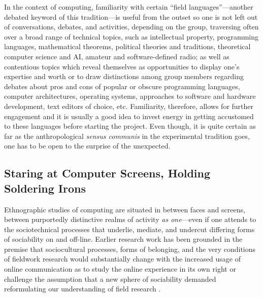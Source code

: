 \documentclass[10pt,letter,oneside]{scrartcl}
\begin{document}
In the context of computing, familiarity with certain ``field
languages''---another debated keyword of this tradition---is useful from the
outset so one is not left out of conversations, debates, and
activities, depending on the group, traversing often over a broad range 
of technical topics, such as intellectual property, programming languages, 
mathematical theorems, political theories and traditions, theoretical 
computer science and AI, amateur and software-defined radio; as well as
contentious topics which reveal themselves as opportunities to display
one's expertise and worth or to draw distinctions among group members
regarding debates about pros and cons of popular or obscure
programming languages, computer architectures, operating systems,
approaches to software and hardware development, text editors of
choice, etc. Familiarity, therefore, allows for further engagement and
it is usually a good idea to invest energy in getting accustomed to these
languages before starting the project. Even though, it is quite
certain as far as the anthropological \emph{sensus communis} in the
experimental tradition goes, one has to be open to the surprise of the 
unexpected.



\subsection*{Staring at Computer Screens, Holding Soldering Irons}

Ethnographic studies of computing are situated in between faces and
screens, between purportedly distinctive realms of activity \emph{as
  one}---even if one attends to the sociotechnical processes that
underlie, mediate, and undercut differing forms of sociability on and
off-line. Earlier research work has been grounded in the premise that
sociocultural processes, forms of belonging, and the very conditions
of fieldwork research would substantially change with the increased
usage of online communication as to study the online experience in its
own right \cite{Turkle1984,Hine2000,BOELLSTORFF2008} or challenge the
assumption that a new sphere of sociability demanded reformulating our
understanding of field research \cite{Miller2001,Malaby2009}.
\end{document}
